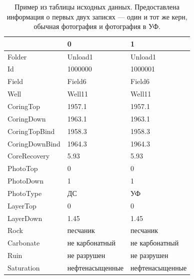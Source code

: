\documentclass[14pt]{matmex-diploma}
\begin{document}
    \begin{table}[h!]
        \centering
        \begin{tabular}{|l|l|l|}
            \hline
            {} &                0 &                1 \\
            \hline
            Folder         &          Unload1 &          Unload1 \\
            Id             &          1000000 &          1000001 \\
            Field          &           Field6 &           Field6 \\
            Well           &           Well11 &           Well11 \\
            CoringTop      &           1957.1 &           1957.1 \\
            CoringDown     &           1963.1 &           1963.1 \\
            CoringTopBind  &           1958.3 &           1958.3 \\
            CoringDownBind &           1964.3 &           1964.3 \\
            CoreRecovery   &             5.93 &             5.93 \\
            PhotoTop       &                0 &                0 \\
            PhotoDown      &                1 &                1 \\
            PhotoType      &               ДС &               УФ \\
            LayerTop       &                0 &                0 \\
            LayerDown      &             1.45 &             1.45 \\
            Rock           &         песчаник &         песчаник \\
            Carbonate      &   не карбонатный &   не карбонатный \\
            Ruin           &      не разрушен &      не разрушен \\
            Saturation     &  нефтенасыщенные &  нефтенасыщенные \\
            \hline
        \end{tabular}
        \caption{Пример из таблицы исходных данных. Предоставлена информация о первых двух записях — один и тот же керн, обычная фотография и фотография в УФ.}
        \label{sample_table}  
        \vspace*{2 cm}
    \end{table}
\end{document}

